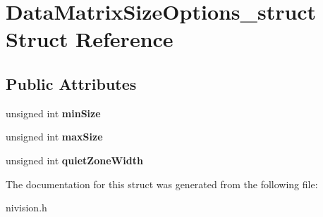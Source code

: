 \hypertarget{structDataMatrixSizeOptions__struct}{\section{\-Data\-Matrix\-Size\-Options\-\_\-struct \-Struct \-Reference}
\label{structDataMatrixSizeOptions__struct}
}
\subsection*{\-Public \-Attributes}
\begin{DoxyCompactItemize}
\item 
\hypertarget{structDataMatrixSizeOptions__struct_a2c7f1a5e2e022fdd591cf0a43b48994e}{unsigned int {\bfseries min\-Size}}\label{structDataMatrixSizeOptions__struct_a2c7f1a5e2e022fdd591cf0a43b48994e}

\item 
\hypertarget{structDataMatrixSizeOptions__struct_a0297ba66a4dcb8d97866f67ec323d9e9}{unsigned int {\bfseries max\-Size}}\label{structDataMatrixSizeOptions__struct_a0297ba66a4dcb8d97866f67ec323d9e9}

\item 
\hypertarget{structDataMatrixSizeOptions__struct_afa05c5ab0e032f0720e257a04a5cbacf}{unsigned int {\bfseries quiet\-Zone\-Width}}\label{structDataMatrixSizeOptions__struct_afa05c5ab0e032f0720e257a04a5cbacf}

\end{DoxyCompactItemize}


\-The documentation for this struct was generated from the following file\-:\begin{DoxyCompactItemize}
\item 
nivision.\-h\end{DoxyCompactItemize}

